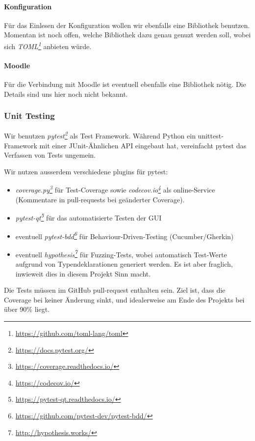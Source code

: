 \documentclass[a4paper]{article}
\newcommand{\tool}[2]{\emph{#1\footnote{\url{#2}}}}
\begin{document}
\paragraph{Konfiguration}

Für das Einlesen der Konfiguration wollen wir ebenfalls eine Bibliothek
benutzen. Momentan ist noch offen, welche Bibliothek dazu genau genuzt werden
soll, wobei sich \tool{TOML}{https://github.com/toml-lang/toml} anbieten würde.

\paragraph{Moodle}

Für die Verbindung mit Moodle ist eventuell ebenfalls eine Bibliothek nötig.
Die Details sind uns hier noch nicht bekannt.

\subsubsection{Unit Testing}

Wir benutzen \tool{pytest}{https://docs.pytest.org/} als Test
Framework. Während Python ein unittest-Framework mit einer JUnit-Ähnlichen API
eingebaut hat, vereinfacht pytest das Verfassen von Tests ungemein.

Wir nutzen ausserdem verschiedene plugins für pytest:

\begin{itemize}
\item \tool{coverage.py}{https://coverage.readthedocs.io/} für
    Test-Coverage sowie \tool{codecov.io}{https://codecov.io/}
    als online-Service (Kommentare in pull-requests bei geänderter Coverage).
\item \tool{pytest-qt}{https://pytest-qt.readthedocs.io/} für das
    automatisierte Testen der GUI
\item eventuell \tool{pytest-bdd}{https://github.com/pytest-dev/pytest-bdd/} für Behaviour-Driven-Testing (Cucumber/Gherkin)
\item eventuell \tool{hypothesis}{http://hypothesis.works/} für
  Fuzzing-Tests, wobei automatisch Test-Werte aufgrund von Typendeklarationen
  generiert werden. Es ist aber fraglich, inwieweit dies in diesem Projekt Sinn macht.
\end{itemize}

Die Tests müssen im GitHub pull-request enthalten sein. Ziel ist, dass die
Coverage bei keiner Änderung sinkt, und idealerweise am Ende des Projekts bei
über 90\% liegt.
\end{document}
